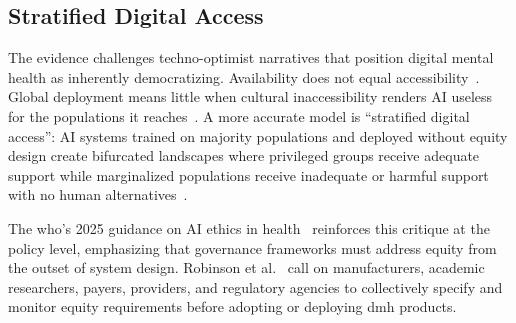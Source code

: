 \subsection{Stratified Digital Access}

The evidence challenges techno-optimist narratives that position digital mental health as inherently democratizing. Availability does not equal accessibility~\cite{khan_seo_2025}. Global deployment means little when cultural inaccessibility renders AI useless for the populations it reaches~\cite{aleem_2024}. A more accurate model is ``stratified digital access'': AI systems trained on majority populations and deployed without equity design create bifurcated landscapes where privileged groups receive adequate support while marginalized populations receive inadequate or harmful support with no human alternatives~\cite{robinson_2024,timmons_2023}.

The \gls{who}'s 2025 guidance on AI ethics in health~\cite{who_2025} reinforces this critique at the policy level, emphasizing that governance frameworks must address equity from the outset of system design. Robinson et al.~\cite{robinson_2024} call on manufacturers, academic researchers, payers, providers, and regulatory agencies to collectively specify and monitor equity requirements before adopting or deploying \gls{dmh} products.
